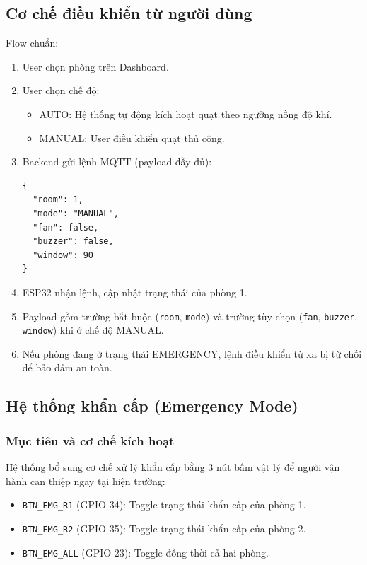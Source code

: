 \documentclass[../BTL_PTIT.tex]{subfiles}
\begin{document}
\subsection{Cơ chế điều khiển từ người dùng}
Flow chuẩn:
\begin{enumerate}[label=\arabic*.]
    \item User chọn phòng trên Dashboard.
    \item User chọn chế độ:
    \begin{itemize}[label=--]
        \item AUTO: Hệ thống tự động kích hoạt quạt theo ngưỡng nồng độ khí.
        \item MANUAL: User điều khiển quạt thủ công.
    \end{itemize}
    \item Backend gửi lệnh MQTT (payload đầy đủ):
\begin{lstlisting}[language={}]
{
  "room": 1,
  "mode": "MANUAL",
  "fan": false,
  "buzzer": false,
  "window": 90
}
\end{lstlisting}
    \item ESP32 nhận lệnh, cập nhật trạng thái của phòng 1.
    \item Payload gồm trường bắt buộc (\texttt{room}, \texttt{mode}) và trường tùy chọn (\texttt{fan}, \texttt{buzzer}, \texttt{window}) khi ở chế độ MANUAL.
    \item Nếu phòng đang ở trạng thái EMERGENCY, lệnh điều khiển từ xa bị từ chối để bảo đảm an toàn.
\end{enumerate}

\subsection{Hệ thống khẩn cấp (Emergency Mode)}

\subsubsection{Mục tiêu và cơ chế kích hoạt}
Hệ thống bổ sung cơ chế xử lý khẩn cấp bằng 3 nút bấm vật lý để người vận hành can thiệp ngay tại hiện trường:
\begin{itemize}[label=\textbullet]
    \item \texttt{BTN\_EMG\_R1} (GPIO 34): Toggle trạng thái khẩn cấp của phòng 1.
    \item \texttt{BTN\_EMG\_R2} (GPIO 35): Toggle trạng thái khẩn cấp của phòng 2.
    \item \texttt{BTN\_EMG\_ALL} (GPIO 23): Toggle đồng thời cả hai phòng.
\end{itemize}
\end{document}
